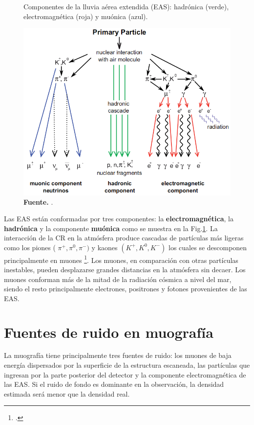  \begin{figure}[h]
    \begin{center}
        \caption[Componentes de la lluvia aérea extendida(EAS)]{Componentes de la lluvia aérea extendida (EAS):
        hadrónica (verde), electromagnética (roja) y muónica (azul\textbf{}).}
        \includegraphics[width=0.78
        \textwidth]{Figures/imagenes/EAS_Components}
        \caption*{\textbf{Fuente.} \cite{Haungs2011}. }
        \label{Components}
    \end{center}
\end{figure}
 
Las EAS están conformadas por tres componentes: la \textbf{electromagnética}, la \textbf{hadrónica} y la componente \textbf{muónica} como se muestra en la Fig.\ref{Components}. La interacción de la CR en la atmósfera produce cascadas de partículas más ligeras como los piones ( $\pi^{+},\pi^{0},\pi^{-})$ y kaones $(K^{+},K^{0},K^{-})$ los cuales se descomponen principalmente en muones \footcite{tanabashi2018review}. Los muones, en comparación con otras partículas inestables, pueden desplazarse grandes distancias en la atmósfera sin decaer. Los muones conforman más de la mitad de la radiación cósmica a nivel del mar, siendo el resto principalmente electrones, positrones y fotones provenientes de las EAS. 


\section{Fuentes de ruido en muografía}
La muografía tiene principalmente tres fuentes de ruido: los muones de baja energía dispersados por la superficie de la estructura escaneada, las partículas que ingresan por la parte posterior del detector y la componente electromagnética de las EAS. Si el ruido de fondo es dominante en la observación, la densidad estimada será menor que la densidad real. 


